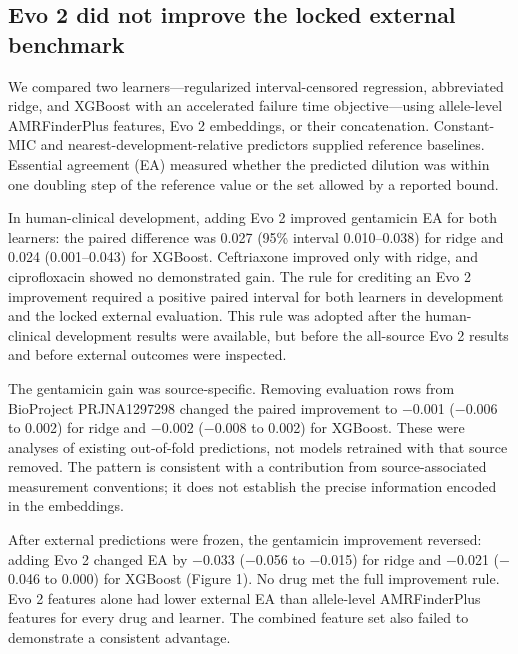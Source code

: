 \documentclass[
  american,
  11pt,
]{article}
\begin{document}
\subsection{Evo 2 did not improve the locked external
benchmark}\label{evo-2-did-not-improve-the-locked-external-benchmark}

We compared two learners---regularized interval-censored regression,
abbreviated ridge, and XGBoost with an accelerated failure time
objective---using allele-level AMRFinderPlus features, Evo 2 embeddings,
or their concatenation. Constant-MIC and nearest-development-relative
predictors supplied reference baselines. Essential agreement (EA)
measured whether the predicted dilution was within one doubling step of
the reference value or the set allowed by a reported bound.

In human-clinical development, adding Evo 2 improved gentamicin EA for
both learners: the paired difference was 0.027 (95\% interval
0.010--0.038) for ridge and 0.024 (0.001--0.043) for XGBoost.
Ceftriaxone improved only with ridge, and ciprofloxacin showed no
demonstrated gain. The rule for crediting an Evo 2 improvement required
a positive paired interval for both learners in development and the
locked external evaluation. This rule was adopted after the
human-clinical development results were available, but before the
all-source Evo 2 results and before external outcomes were inspected.

The gentamicin gain was source-specific. Removing evaluation rows from
BioProject PRJNA1297298 changed the paired improvement to \ensuremath{-}0.001 (\ensuremath{-}0.006
to 0.002) for ridge and \ensuremath{-}0.002 (\ensuremath{-}0.008 to 0.002) for XGBoost. These were
analyses of existing out-of-fold predictions, not models retrained with
that source removed. The pattern is consistent with a contribution from
source-associated measurement conventions; it does not establish the
precise information encoded in the embeddings.

After external predictions were frozen, the gentamicin improvement
reversed: adding Evo 2 changed EA by \ensuremath{-}0.033 (\ensuremath{-}0.056 to \ensuremath{-}0.015) for ridge
and \ensuremath{-}0.021 (\ensuremath{-}0.046 to 0.000) for XGBoost (Figure 1). No drug met the
full improvement rule. Evo 2 features alone had lower external EA than
allele-level AMRFinderPlus features for every drug and learner. The
combined feature set also failed to demonstrate a consistent advantage.
\end{document}
